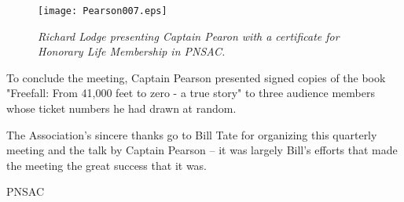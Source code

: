 \begin{figure}[htbp]
   \vspace{2em}
   \centering
   \texttt{[image: Pearson007.eps]}
   \caption*{\small \em Richard Lodge presenting Captain Pearon with a
     certificate for Honorary Life Membership in PNSAC.}
   \label{fig:engine3propcowl}
\end{figure}

To conclude the meeting, Captain Pearson presented signed copies of
the book "Freefall: From 41,000 feet to zero - a true story" to three
audience members whose ticket numbers he had drawn at random.

The Association's sincere thanks go to Bill Tate for organizing this
quarterly meeting and the talk by Captain Pearson -- it was largely
Bill's efforts that made the meeting the great success that it was.


\begin{footnotesize}
    \raggedleft PNSAC\\
\end{footnotesize}

